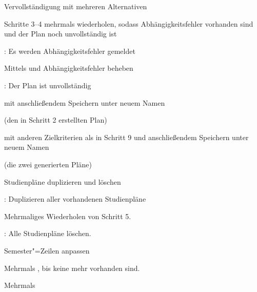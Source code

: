 \begin{scenario}{Vervollständigung mit mehreren Alternativen}
	\item {}
	\item {}
	\item {}
	\item {}
	\item Schritte 3–4 mehrmals wiederholen, sodass Abhängigkeitsfehler vorhanden sind und der Plan noch unvollständig ist
	\item {}: Es werden Abhängigkeitsfehler gemeldet
	\item Mittels  und  Abhängigkeitsfehler beheben
	\item {}: Der Plan ist unvollständig
	\item {} mit anschließendem Speichern unter neuem Namen
	\item {}
	\item {} (den in Schritt 2 erstellten Plan)
	\item {} mit anderen Zielkriterien als in Schritt 9 und anschließendem Speichern unter neuem Namen
	\item {}
	\item {} (die zwei generierten Pläne)
\end{scenario}

\begin{scenario}{Studienpläne duplizieren und löschen}
	\item {}
	\item {}
	\item {}
	\item {}
	\item {}: Duplizieren aller vorhandenen Studienpläne
	\item Mehrmaliges Wiederholen von Schritt 5.
	\item {}: Alle Studienpläne löschen.
\end{scenario}

\begin{scenario}{Semester"=Zeilen anpassen}
	\item {}
	\item {}
	\item Mehrmals , bis keine mehr vorhanden sind.
	\item Mehrmals 
	\item {}
\end{scenario}



